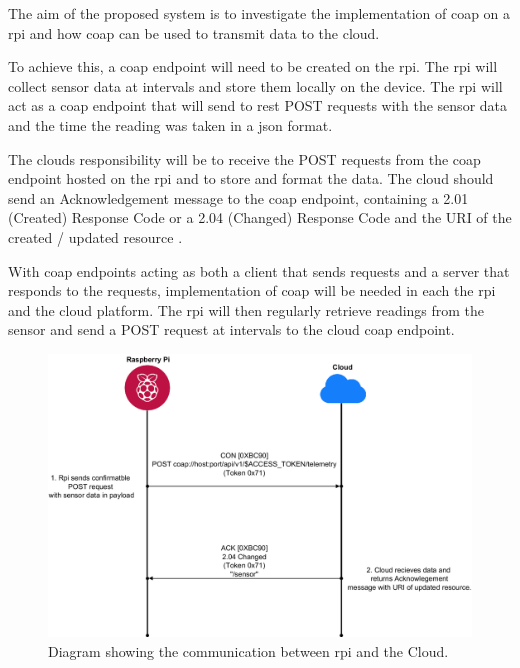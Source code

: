 The aim of the proposed system is to investigate the implementation of \gls{coap} 
on a \gls{rpi} and how \gls{coap} can be used to transmit data to the cloud. 

To achieve this, a \gls{coap} endpoint will need to be created on the \gls{rpi}. 
The \gls{rpi} will collect sensor data at intervals and store them 
locally on the device. The \gls{rpi} will act as a \gls{coap} endpoint that will 
send to \gls{rest} POST requests with the sensor data and the time
the reading was taken in a \gls{json} format.

The clouds responsibility will be to receive the POST requests from the \gls{coap} 
endpoint hosted on the \gls{rpi} and to store and format the data. 
The cloud should send an Acknowledgement message to the \gls{coap} endpoint, 
containing a 2.01 (Created) Response Code or a 2.04 (Changed) Response Code 
and the URI of the created / updated resource \citep{shelby_constrained_2014}. 

With \gls{coap} endpoints acting as both a client that sends requests and a 
server that responds to the requests, implementation of \gls{coap} will be needed 
in each the \gls{rpi} and the cloud platform. The \gls{rpi} will then regularly 
retrieve readings from the sensor and send a POST request 
at intervals to the cloud \gls{coap} endpoint. 

\begin{figure}[H]
    \centering
    \includegraphics[width=\imageWidth\textwidth]{assets/rpi_cloud_communication.png}
    \caption{\label{fig:rpi_cloud_comms} Diagram showing the communication between \gls{rpi} and the Cloud.}
\end{figure}